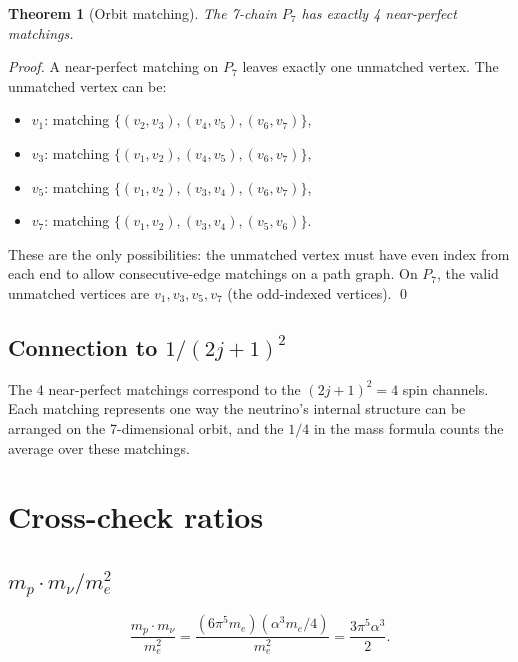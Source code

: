 \documentclass[11pt,letterpaper]{article}
\newtheorem{theorem}{Theorem}[section]
\numberwithin{equation}{section}
\begin{document}
\begin{theorem}[Orbit matching]
\label{thm:orbit}
The 7-chain $P_7$ has exactly 4 near-perfect matchings.
\end{theorem}

\textit{Proof.}
A near-perfect matching on $P_7$ leaves exactly one unmatched vertex. The
unmatched vertex can be:
\begin{itemize}
  \item $v_1$: matching $\{(v_2,v_3), (v_4,v_5), (v_6,v_7)\}$,
  \item $v_3$: matching $\{(v_1,v_2), (v_4,v_5), (v_6,v_7)\}$,
  \item $v_5$: matching $\{(v_1,v_2), (v_3,v_4), (v_6,v_7)\}$,
  \item $v_7$: matching $\{(v_1,v_2), (v_3,v_4), (v_5,v_6)\}$.
\end{itemize}
These are the only possibilities: the unmatched vertex must have even index
from each end to allow consecutive-edge matchings on a path graph. On $P_7$,
the valid unmatched vertices are $v_1, v_3, v_5, v_7$ (the odd-indexed
vertices). \qed

\subsection{Connection to $1/(2j+1)^2$}

The 4 near-perfect matchings correspond to the $(2j+1)^2 = 4$ spin channels.
Each matching represents one way the neutrino's internal structure can be
arranged on the 7-dimensional orbit, and the $1/4$ in the mass formula
counts the average over these matchings.

\section{Cross-check ratios}
\label{sec:cross_checks}

\subsection{$m_p \cdot m_\nu / m_e^2$}

\begin{equation}
  \frac{m_p \cdot m_\nu}{m_e^2}
  = \frac{(6\pi^5 m_e)(\alpha^3 m_e/4)}{m_e^2}
  = \frac{3\pi^5\alpha^3}{2}.
\end{equation}
\end{document}

